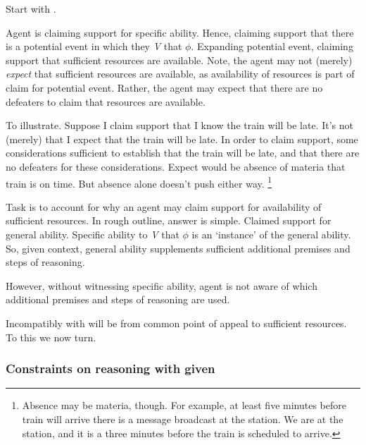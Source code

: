 \begin{note}
  Start with \gsi{}.

  Agent is claiming support for specific ability.
  Hence, claiming support that there is a potential event in which they \emph{V} that \(\phi\).
  Expanding potential event, claiming support that sufficient resources are available.
  Note, the agent may not (merely) \emph{expect} that sufficient resources are available, as availability of resources is part of claim for potential event.
  Rather, the agent may expect that there are no defeaters to claim that resources are available.

  To illustrate.
  Suppose I claim support that I know the train will be late.
  It's not (merely) that I expect that the train will be late.
  In order to claim support, some considerations sufficient to establish that the train will be late, and that there are no defeaters for these considerations.
  Expect would be absence of materia that train is on time.
  But absence alone doesn't push either way.\nolinebreak
  \footnote{
    Absence may be materia, though.
    For example, at least five minutes before train will arrive there is a message broadcast at the station.
    We are at the station, and it is a three minutes before the train is scheduled to arrive.
  }

  Task is to account for why an agent may claim support for availability of sufficient resources.
  In rough outline, answer is simple.
  Claimed support for general ability.
  Specific ability to \emph{V} that \(\phi\) is an `instance' of the general ability.
  So, given context, general ability supplements sufficient additional premises and steps of reasoning.

  However, without witnessing specific ability, agent is not aware of which additional premises and steps of reasoning are used.
\end{note}

\begin{note}
  Incompatibly with \ESU{} will be from common point of appeal to sufficient resources.
  To this we now turn.
\end{note}

\subsubsection{Constraints on reasoning with \gsi{} given \ESU{}}
\label{sec:incomp-wr-ura}

